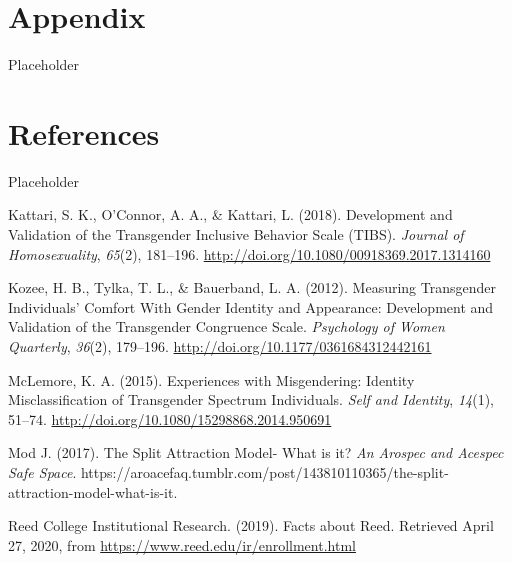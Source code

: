 \documentclass[12pt,twoside]{reedthesis}
\newlength{\cslhangindent}
\newenvironment{cslreferences}%
  {\setlength{\parindent}{0pt}%
  \everypar{\setlength{\hangindent}{\cslhangindent}}\ignorespaces}%
  {\par}
\begin{document}
\hypertarget{appendix}{%
\chapter*{Appendix}\label{appendix}}

Placeholder

\hypertarget{references}{%
\chapter*{References}\label{references}}

Placeholder

\hypertarget{refs}{}
\begin{cslreferences}
\leavevmode\hypertarget{ref-kattariDevelopmentValidationTransgender2018}{}%
Kattari, S. K., O'Connor, A. A., \& Kattari, L. (2018). Development and Validation of the Transgender Inclusive Behavior Scale (TIBS). \emph{Journal of Homosexuality}, \emph{65}(2), 181--196. \url{http://doi.org/10.1080/00918369.2017.1314160}

\leavevmode\hypertarget{ref-kozeeMeasuringTransgenderIndividuals2012}{}%
Kozee, H. B., Tylka, T. L., \& Bauerband, L. A. (2012). Measuring Transgender Individuals' Comfort With Gender Identity and Appearance: Development and Validation of the Transgender Congruence Scale. \emph{Psychology of Women Quarterly}, \emph{36}(2), 179--196. \url{http://doi.org/10.1177/0361684312442161}

\leavevmode\hypertarget{ref-mclemoreExperiencesMisgenderingIdentity2015}{}%
McLemore, K. A. (2015). Experiences with Misgendering: Identity Misclassification of Transgender Spectrum Individuals. \emph{Self and Identity}, \emph{14}(1), 51--74. \url{http://doi.org/10.1080/15298868.2014.950691}

\leavevmode\hypertarget{ref-modjSplitAttractionModel2017}{}%
Mod J. (2017). The Split Attraction Model- What is it? \emph{An Arospec and Acespec Safe Space}. https://aroacefaq.tumblr.com/post/143810110365/the-split-attraction-model-what-is-it.

\leavevmode\hypertarget{ref-reedcollegeinstitutionalresearchFactsReed2019}{}%
Reed College Institutional Research. (2019). Facts about Reed. Retrieved April 27, 2020, from \url{https://www.reed.edu/ir/enrollment.html}
\end{cslreferences}

\end{document}

